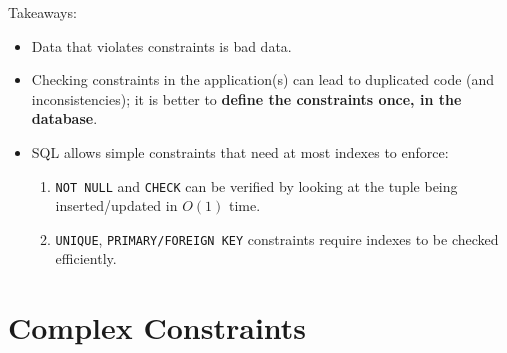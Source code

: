 \documentclass[xcolor={usenames,dvipsnames}]{beamer}
\begin{document}


\begin{frame}

Takeaways:
\begin{itemize}[-]
\item Data that violates constraints is \alert{bad data}.
\item Checking constraints in the application(s) can lead to duplicated code (and inconsistencies); it is better to \textbf{define the constraints once, in the database}.
\item SQL allows simple constraints that need at most indexes to enforce:
\begin{enumerate}[(1)]
\item \lstinline[style=SQL]{NOT NULL} and \lstinline[style=SQL]{CHECK} can be verified by looking at the tuple being inserted/updated in $O(1)$ time.
\item \lstinline[style=SQL]{UNIQUE}, \lstinline[style=SQL]{PRIMARY/FOREIGN KEY} constraints require indexes to be checked efficiently.
\end{enumerate}
\end{itemize}
\end{frame}

%
%

\section{Complex Constraints}
\end{document}
